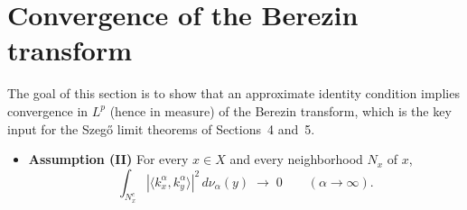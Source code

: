 \documentclass{amsart}
\theoremstyle{definition}
\theoremstyle{remark}
\numberwithin{equation}{section}
\newcommand{\norm}[1]{\left\lVert #1 \right\rVert} %
\begin{document}

\section{Convergence of the Berezin transform}

The goal of this section is to show that an approximate identity
condition implies convergence in $L^p$ (hence in measure)
of the Berezin transform, which is the key input for the
Szeg\H{o} limit theorems of Sections~4 and~5.

\medskip

\noindent
\begin{itemize}
    \item \textbf{Assumption (II)} For every $x\in X$ and every neighborhood $N_x$ of $x$,
\[
    \int_{N_x^c}
    |\langle k_x^\alpha,k_y^\alpha\rangle|^2
    \, d\nu_\alpha(y)
    \;\longrightarrow\; 0
    \qquad (\alpha\to\infty).
\]
\end{itemize}
\end{document}
